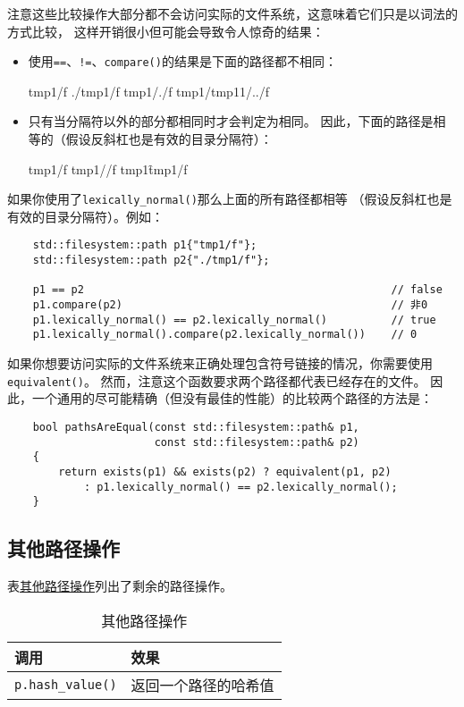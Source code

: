 注意这些比较操作大部分都不会访问实际的文件系统，这意味着它们只是以词法的方式比较，
这样开销很小但可能会导致令人惊奇的结果：
\begin{itemize}
    \item 使用\texttt{==}、\texttt{!=}、\texttt{compare()}的结果是下面的路径都不相同：
    \begin{blacklisting}
        tmp1/f
        ./tmp1/f
        tmp1/./f
        tmp1/tmp11/../f
    \end{blacklisting}
    \item 只有当分隔符以外的部分都相同时才会判定为相同。
    因此，下面的路径是相等的（假设反斜杠也是有效的目录分隔符）：
    \begin{blacklisting}
        tmp1/f
        tmp1//f
        tmp1\f
        tmp1/\/f
    \end{blacklisting}
\end{itemize}
如果你使用了\texttt{lexically\_normal()}那么上面的所有路径都相等
（假设反斜杠也是有效的目录分隔符）。例如：
\begin{lstlisting}
    std::filesystem::path p1{"tmp1/f"};
    std::filesystem::path p2{"./tmp1/f"};

    p1 == p2                                                // false
    p1.compare(p2)                                          // 非0
    p1.lexically_normal() == p2.lexically_normal()          // true
    p1.lexically_normal().compare(p2.lexically_normal())    // 0
\end{lstlisting}
如果你想要访问实际的文件系统来正确处理包含符号链接的情况，你需要使用\texttt{equivalent()}。
然而，注意这个函数要求两个路径都代表已经存在的文件。
因此，一个通用的尽可能精确（但没有最佳的性能）的比较两个路径的方法是：
\begin{lstlisting}
    bool pathsAreEqual(const std::filesystem::path& p1,
                       const std::filesystem::path& p2)
    {
        return exists(p1) && exists(p2) ? equivalent(p1, p2)
            : p1.lexically_normal() == p2.lexically_normal();
    }
\end{lstlisting}

\subsection{其他路径操作}
表\hyperref[t20.9]{其他路径操作}列出了剩余的路径操作。
\begin{table}[htb]
    \centering
    \begin{tabular}{l|l}
        \hline
        \textbf{调用}              & \textbf{效果} \\
        \hline
        \texttt{p.hash\_value()} & 返回一个路径的哈希值  \\
        \hline
    \end{tabular}
    \caption{其他路径操作}
    \label{t20.9}
\end{table}

